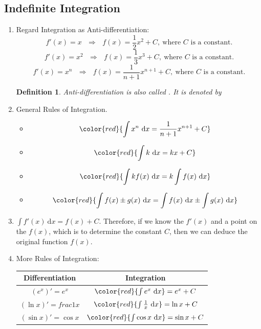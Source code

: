 \documentclass[12pt, a4paper]{article}
\newtheorem{definition}{Definition}[subsection]
\begin{document}
\subsection{Indefinite Integration}
\begin{enumerate}
    \item Regard Integration as Anti-differentiation: 
    $$f'(x)=x\ \ \ \Rightarrow\ \ \ f(x)=\frac{1}{2}x^2+C,\ \text{where }C\text{ is a constant.}$$
    $$f'(x)=x^2\ \ \ \Rightarrow\ \ \ f(x)=\frac{1}{3}x^3+C,\ \text{where }C\text{ is a constant.}$$
    $$f'(x)=x^n\ \ \ \Rightarrow\ \ \ f(x)=\frac{1}{n+1}x^{n+1}+C,\ \text{where }C\text{ is a constant.}$$
    \begin{definition}
        Anti-differentiation is also called \textbf{\color{red}{indefinited integration}}. It is denoted by {}
        \begin{center}{}\end{center}
    \end{definition}
    \item General Rules of Integration. 
    \begin{itemize}
        \item $${\color{red}{\int x^n\ \mathrm{d}x=\frac{1}{n+1}x^{n+1}+C}}$$
        \item $${\color{red}{\int k\ \mathrm{d}x=kx+C}}$$
        \item $${\color{red}{\int kf(x)\ \mathrm{d}x=k\int f(x)\ \mathrm{d}x}}$$
        \item $${\color{red}{\int f(x)\pm g(x)\ \mathrm{d}x=\int f(x)\ \mathrm{d}x\pm\int g(x)\ \mathrm{d}x}}$$
    \end{itemize}
    \item $\int f'(x)\ \mathrm{d}x=f(x)+C.$ Therefore, if we know the $f'(x)$ and a point on the $f(x)$, which is to determine the constant $C$, then we can deduce the original function $f(x)$.
    \item More Rules of Integration:
    \begin{center}\begin{tabular}{c|c}
        Differentiation&Integration\\\hline
        $(e^x)'=e^x$&${\color{red}{\int e^x\ \mathrm{d}x}=e^x+C}$\\
        $(\ln x)'=frac{1}{x}$&${\color{red}{\int \frac{1}{x}\ \mathrm{d}x}=\ln x+C}$\\
        $(\sin x)'=\cos x$&${\color{red}{\int \cos x\ \mathrm{d}x}=\sin x+C}$\\

\end{tabular}
\end{center}
\end{enumerate}
\end{document}

